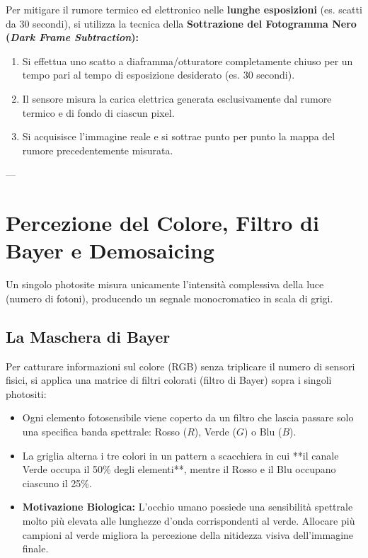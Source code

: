 Per mitigare il rumore termico ed elettronico nelle \textbf{lunghe esposizioni} (es. scatti da 30 secondi), si utilizza la tecnica della \textbf{Sottrazione del Fotogramma Nero (\textit{Dark Frame Subtraction}):}
\begin{enumerate}
    \item Si effettua uno scatto a diaframma/otturatore completamente chiuso per un tempo pari al tempo di esposizione desiderato (es. 30 secondi).
    \item Il sensore misura la carica elettrica generata esclusivamente dal rumore termico e di fondo di ciascun pixel.
    \item Si acquisisce l'immagine reale e si sottrae punto per punto la mappa del rumore precedentemente misurata.
\end{enumerate}

---

\section{Percezione del Colore, Filtro di Bayer e Demosaicing}

Un singolo photosite misura unicamente l'intensità complessiva della luce (numero di fotoni), producendo un segnale monocromatico in scala di grigi.

\subsection{La Maschera di Bayer}
Per catturare informazioni sul colore (RGB) senza triplicare il numero di sensori fisici, si applica una matrice di filtri colorati (filtro di Bayer) sopra i singoli photositi:
\begin{itemize}
    \item Ogni elemento fotosensibile viene coperto da un filtro che lascia passare solo una specifica banda spettrale: Rosso ($R$), Verde ($G$) o Blu ($B$).
    \item La griglia alterna i tre colori in un pattern a scacchiera in cui **il canale Verde occupa il 50\% degli elementi**, mentre il Rosso e il Blu occupano ciascuno il 25\%.
    \item \textbf{Motivazione Biologica:} L'occhio umano possiede una sensibilità spettrale molto più elevata alle lunghezze d'onda corrispondenti al verde. Allocare più campioni al verde migliora la percezione della nitidezza visiva dell'immagine finale.
\end{itemize}

